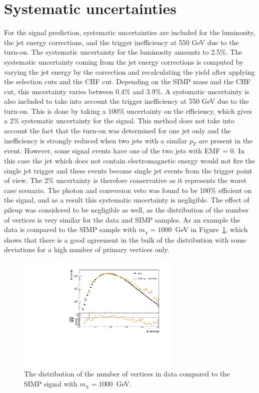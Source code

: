 \section{Systematic uncertainties}
\label{sec:SIMP_systematics}

For the signal prediction, systematic uncertainties are included for the luminosity, the jet energy corrections, and the trigger inefficiency at 550 GeV due to the turn-on. The systematic uncertainty for the luminosity amounts to 2.5\%. The systematic uncertainty coming from the jet energy corrections is computed by varying the jet energy by the correction and recalculating the yield after applying the selection cuts and the CHF cut. Depending on the \ac{SIMP} mass and the CHF cut, this uncertainty varies between 0.4\% and 3.9\%. A systematic uncertainty is also included to take into account the trigger inefficiency at 550 GeV due to the turn-on. This is done by taking a 100\% uncertainty on the efficiency, which gives a 2\% systematic uncertainty for the signal. This method does not take into account the fact that the turn-on was determined for one jet only and the inefficiency is strongly reduced when two jets with a similar $p_T$ are present in the event. However, some signal events have one of the two jets with EMF = 0. In this case the jet which does not contain electromagnetic energy would not fire the single jet trigger and these events become single jet events from the trigger point of view. The 2\% uncertainty is therefore conservative as it represents the worst case scenario. The photon and conversion veto was found to be 100\% efficient on the signal, and as a result this systematic uncertainty is negligible. The effect of pileup was considered to be negligible as well, as the distribution of the number of vertices is very similar for the data and \ac{SIMP} samples. As an example the data is compared to the \ac{SIMP} sample with $m_{\chi} = 1000$~GeV in Figure~\ref{fig:PU}, which shows that there is a good agreement in the bulk of the distribution with some deviations for a high number of primary vertices only.

\begin{figure}[ht]
  \centering
  \includegraphics[width=0.7\textwidth]{figures/PU_reweighting_SIMP_M-1000.pdf}\hfill%
  \caption{The distribution of the number of vertices in data compared to the \ac{SIMP} signal with $m_{\chi} = 1000$~GeV.}
  \label{fig:PU}
\end{figure}

